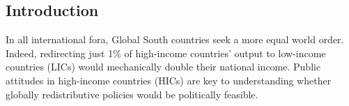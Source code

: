 \documentclass[12pt,english]{article}
\begin{document}
\begin{bibunit}

\section{Introduction}\label{sec:intro}

In all international fora, Global South countries seek %
a more equal world order. Indeed, redirecting just 1\% of high-income countries' output to low-income countries (LICs) would mechanically double their national income.%
Public attitudes in high-income countries (HICs) are key to understanding whether globally redistributive policies would be politically feasible.


\end{bibunit}
\end{document}
